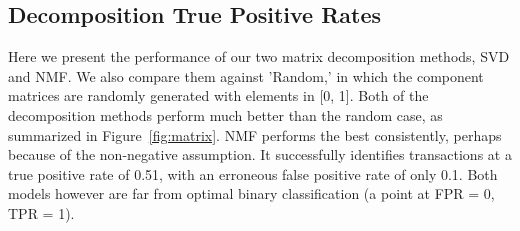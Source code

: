 \documentclass{article} %
\begin{document}
\subsection{Decomposition True Positive Rates}

Here we present the performance of our two matrix decomposition methods, SVD and NMF. We also compare them against 'Random,' in which the component matrices are randomly generated with elements in [0, 1]. Both of the decomposition methods perform much better than the random case, as summarized in Figure~\ref{fig:matrix}. NMF performs the best consistently, perhaps because of the non-negative assumption. It successfully identifies transactions at a true positive rate of 0.51, with an erroneous false positive rate of only 0.1. Both models however are far from optimal binary classification (a point at FPR = 0, TPR = 1). 
\end{document}
